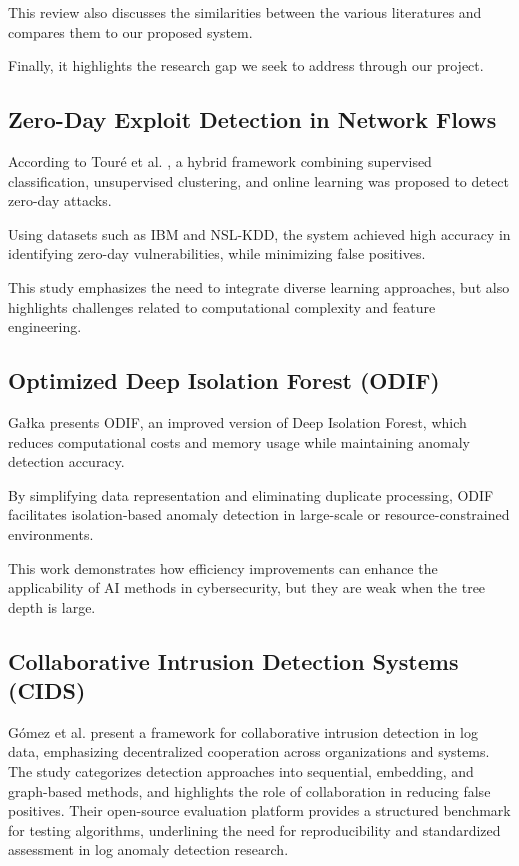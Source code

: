\documentclass[12pt,a4paper]{report} %
\begin{document}
This review also discusses the similarities between the various literatures and compares them to our proposed system.

Finally, it highlights the research gap we seek to address through our project.

\subsection{Zero-Day Exploit Detection in Network Flows}
According to Touré et al. \cite{Toure2024}, a hybrid framework combining supervised classification,
unsupervised clustering, and online learning was proposed to detect zero-day attacks.

Using datasets such as IBM and NSL-KDD, the system achieved high accuracy in identifying zero-day vulnerabilities, while minimizing false positives.

This study emphasizes the need to integrate diverse learning approaches, but also highlights challenges related to computational complexity and feature engineering.

\subsection{Optimized Deep Isolation Forest (ODIF)}
Gałka \cite{Galka2025} presents ODIF, an improved version of Deep Isolation Forest, which reduces computational costs and memory usage while maintaining anomaly detection accuracy.

By simplifying data representation and eliminating duplicate processing, ODIF facilitates isolation-based anomaly detection in large-scale or resource-constrained environments.

This work demonstrates how efficiency improvements can enhance the applicability of AI methods in cybersecurity, but they are weak when the tree depth is large. 

\subsection{Collaborative Intrusion Detection Systems (CIDS)}
Gómez et al. \cite{Gomez2025} present a framework for collaborative intrusion detection in log data, emphasizing decentralized cooperation 
across organizations and systems.  
The study categorizes detection approaches into sequential, embedding, and graph-based methods, and highlights the role 
of collaboration in reducing false positives.  
Their open-source evaluation platform provides a structured benchmark for testing algorithms, underlining the need 
for reproducibility and standardized assessment in log anomaly detection research.  
\end{document}
